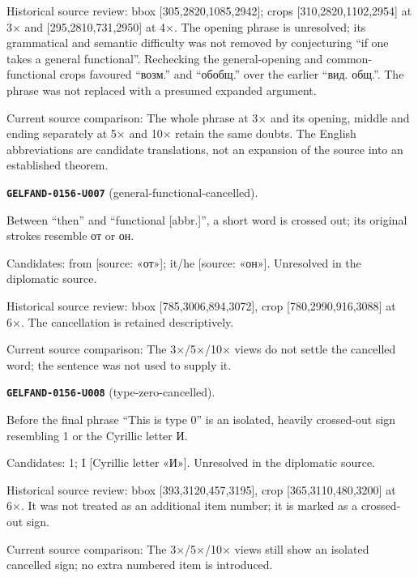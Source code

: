 Historical source review: bbox [305,2820,1085,2942]; crops [310,2820,1102,2954] at 3× and [295,2810,731,2950] at 4×. The opening phrase is unresolved; its grammatical and semantic difficulty was not removed by conjecturing “if one takes a general functional”. Rechecking the general-opening and common-functional crops favoured “возм.” and “обобщ.” over the earlier “вид. общ.”. The phrase was not replaced with a presumed expanded argument.\par
Current source comparison: The whole phrase at 3× and its opening, middle and ending separately at 5× and 10× retain the same doubts. The English abbreviations are candidate translations, not an expansion of the source into an established theorem.\par\medskip
\par\noindent\leavevmode{}\label{GELFAND-0156-U007}\label{GELFAND-P001438:general-functional-cancelled}\textbf{\texttt{GELFAND-0156-U007}} (general-functional-cancelled).\nopagebreak[4]\par
Between “then” and “functional [abbr.]”, a short word is crossed out; its original strokes resemble от or он.\par
Candidates: from [source: «от»]; it/he [source: «он»]. Unresolved in the diplomatic source.\par
Historical source review: bbox [785,3006,894,3072], crop [780,2990,916,3088] at 6×. The cancellation is retained descriptively.\par
Current source comparison: The 3×/5×/10× views do not settle the cancelled word; the sentence was not used to supply it.\par\medskip
\par\noindent\leavevmode{}\label{GELFAND-0156-U008}\label{GELFAND-P001438:type-zero-cancelled}\textbf{\texttt{GELFAND-0156-U008}} (type-zero-cancelled).\nopagebreak[4]\par
Before the final phrase “This is type 0” is an isolated, heavily crossed-out sign resembling 1 or the Cyrillic letter И.\par
Candidates: 1; I [Cyrillic letter «И»]. Unresolved in the diplomatic source.\par
Historical source review: bbox [393,3120,457,3195], crop [365,3110,480,3200] at 6×. It was not treated as an additional item number; it is marked as a crossed-out sign.\par
Current source comparison: The 3×/5×/10× views still show an isolated cancelled sign; no extra numbered item is introduced.\par\medskip
